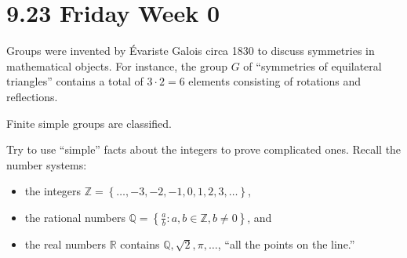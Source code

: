 \documentclass{notes}
\begin{document}
\section{9.23 Friday Week 0}

Groups were invented by Évariste Galois circa 1830 to discuss symmetries in mathematical objects.
For instance, the group $G$ of ``symmetries of equilateral triangles'' contains a total of $3 \cdot 2 = 6$ elements consisting of rotations and reflections.

\begin{thm}
  Finite simple groups are classified.
\end{thm}

\underline{}

Try to use ``simple'' facts about the integers to prove complicated ones.
Recall the number systems: 
\begin{itemize}
  \item the integers $\mathbb Z = \left \{ \dots, -3, -2, -1, 0, 1, 2, 3, \dots \right \}$, 

  \item the rational numbers $\mathbb Q = \left \{ \frac{a}{b} : a, b \in \mathbb Z, b \neq 0 \right \}$, and 

  \item the real numbers $\mathbb R$ contains $\mathbb Q, \sqrt 2, \pi, \dots$, ``all the points on the line.''
\end{itemize}
\end{document}
